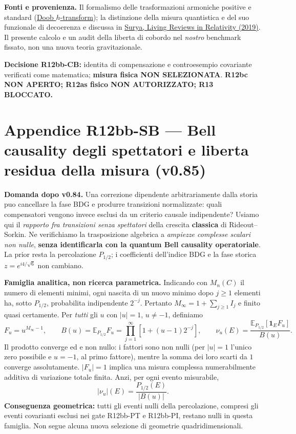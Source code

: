 \documentclass[11pt,a4paper]{article}
\begin{document}
\textbf{Fonti e provenienza.} Il formalismo delle trasformazioni armoniche positive e standard (\href{https://mathworld.wolfram.com/Doobh-Transform.html}{Doob $h$-transform}); la distinzione della misura quantistica e del suo funzionale di decoerenza e discussa in \href{https://doi.org/10.1007/s41114-019-0023-1}{Surya, Living Reviews in Relativity (2019)}. Il presente calcolo e un audit della liberta di cobordo nel \emph{nostro} benchmark fissato, non una nuova teoria gravitazionale.

\textbf{Decisione R12bb-CB:} identita di compensazione e controesempio covariante verificati come matematica; \textbf{misura fisica NON SELEZIONATA}. \textbf{R12bc NON APERTO; R12as fisico NON AUTORIZZATO; R13 BLOCCATO.}

\clearpage
\section*{Appendice R12bb-SB --- Bell causality degli spettatori e liberta residua della misura (v0.85)}
\textbf{Domanda dopo v0.84.} Una correzione dipendente arbitrariamente dalla storia puo cancellare la fase BDG e produrre transizioni normalizzate: quali compensatori vengono invece esclusi da un criterio causale indipendente? Usiamo qui il \emph{rapporto fra transizioni senza spettatori} della crescita \textbf{classica} di Rideout--Sorkin. Ne verifichiamo la trasposizione algebrica a \emph{ampiezze complesse scalari non nulle}, \textbf{senza identificarla con la quantum Bell causality operatoriale}. La prior resta la percolazione $P_{1/2}$; i coefficienti dell'indice BDG e la fase storica $z=e^{i4/\sqrt6}$ non cambiano.

\textbf{Famiglia analitica, non ricerca parametrica.} Indicando con $M_n(C)$ il numero di elementi minimi, ogni nascita di un nuovo minimo dopo $j\ge1$ elementi ha, sotto $P_{1/2}$, probabilita indipendente $2^{-j}$. Pertanto $M_\infty=1+\sum_{j\ge1}I_j$ e finito quasi certamente. Per \emph{tutti} gli $u$ con $|u|=1$, $u\ne-1$, definiamo
\begin{equation}
 F_u=u^{M_\infty-1},\qquad B(u)=\mathbb E_{P_{1/2}}F_u
 =\prod_{j=1}^{\infty}\left[1+(u-1)2^{-j}\right],\qquad
 \nu_u(E)=\frac{\mathbb E_{P_{1/2}}[\mathbf 1_EF_u]}{B(u)}.
 \tag{SB.1}
\end{equation}
Il prodotto converge ed e non nullo: i fattori sono non nulli (per $|u|=1$ l'unico zero possibile e $u=-1$, al primo fattore), mentre la somma dei loro scarti da $1$ converge assolutamente. $|F_u|=1$ implica una misura complessa numerabilmente additiva di variazione totale finita. Anzi, per ogni evento misurabile,
\begin{equation}
 \boxed{|\nu_u|(E)=\frac{P_{1/2}(E)}{|B(u)|}.}\tag{SB.2}
\end{equation}
\textbf{Conseguenza geometrica:} tutti gli eventi nulli della percolazione, compresi gli eventi covarianti esclusi nei gate R12bb-PT e R12bb-PI, restano nulli in questa famiglia. Non segue alcuna nuova selezione di geometrie quadridimensionali.
\end{document}
